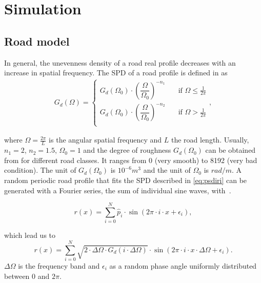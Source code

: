 \chapter{Simulation}
\label{chaptr:simulation}
 
 
 \section{Road model}
 \label{sec:roadmodel}
 
 In general, the unevenness density of a road real profile decreases with an increase in spatial frequency.
%
The \ac{SPD} of a road profile is defined in \cite{_iso_2016} as 
\begin{align}\label{eq:psdiri}
G_d(\Omega) =
  \begin{cases}
    G_d(\Omega_0) \cdot \left(\dfrac{\Omega}{\Omega_0} \right)^{-n_1}  & \quad \text{if } \Omega \leq \frac{1}{2 \pi}\\
    G_d(\Omega_0) \cdot \left(\dfrac{\Omega}{\Omega_0} \right)^{-n_2}  & \quad \text{if } \Omega > \frac{1}{2 \pi}\\
  \end{cases},
\end{align}

where $\Omega = \frac{2\pi}{L}$ is the angular spatial frequency and $L$ the road length. Usually, $n_1=2$, $n_2=1.5$, $\Omega_0=1$ and the degree of roughness $G_d(\Omega_0)$ can be obtained from \cite{_iso_2016} for different road classes. It ranges from 0 (very smooth) to 8192 (very bad condition).
%
The unit of $G_d(\Omega_0)$ is $10^{-6}m^3$ and the unit of $\Omega_0$ is $rad/m$.
%
A random periodic road profile that fits the \ac{SPD} described in \eqref{eq:psdiri} can be generated with a Fourier series, the sum of individual sine waves, with~\cite{cebon_handbook_1999-1, agostinacchio_vibrations_2014}.

\begin{equation}
r(x)= \sum_{i=0}^{N}{\hat{p}_i \cdot \sin(2\pi \cdot i \cdot x+ \epsilon_i)}, \label{eq:RoadProf} 
\end{equation}

which lead us to
\begin{equation}
r(x)= \sum_{i=0}^{N}{\sqrt{2 \cdot \Delta\Omega \cdot G_d(i\cdot\Delta\Omega)} \cdot \sin(2\pi \cdot i \cdot x \cdot \Delta\Omega + \epsilon_i)}. \label{eq:genRoadProf}
\end{equation}
%
$\Delta\Omega$ is the frequency band and $\epsilon_i$ as a random phase angle uniformly distributed between $0$ and $2\pi$.

